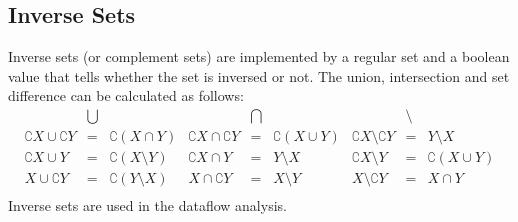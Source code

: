 \begin{docpart}
\subsection{Inverse Sets}
Inverse sets (or complement sets) are implemented by a regular set and
a boolean value that tells whether the set is inversed or not. The
union, intersection and set difference can be calculated as follows:
\[
\begin{array}{rclrclrcl}
  & \bigcup & & & \bigcap & & & \setminus \\
  \complement X \cup \complement Y &=& \complement(X \cap Y)
  & \complement X \cap \complement Y &=& \complement(X \cup Y) 
  & \complement X \setminus \complement Y &=& Y \setminus X \\
  \complement X \cup Y &=& \complement(X \setminus Y)
  & \complement X \cap Y &=& Y \setminus X 
  & \complement X \setminus Y &=& \complement(X \cup Y) \\
  X \cup \complement Y &=& \complement(Y \setminus X)
  & X \cap \complement Y &=& X \setminus Y 
  & X \setminus \complement Y &=& X \cap Y \\
\end{array}
\]
Inverse sets are used in the dataflow analysis.

\end{docpart}
